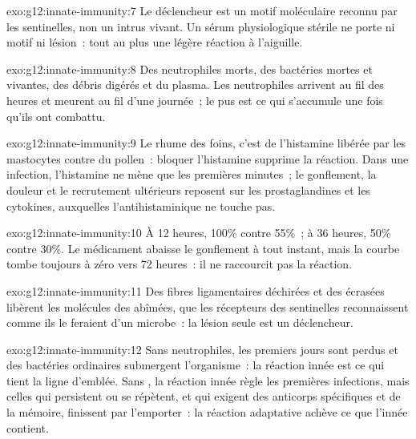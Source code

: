 \begin{solution}{exo:g12:innate-immunity:7}
Le déclencheur est un motif moléculaire reconnu par les 
sentinelles, non un intrus vivant. Un sérum physiologique stérile ne
porte ni motif ni lésion~: tout au plus une légère réaction à
l'aiguille.
\end{solution}

\begin{solution}{exo:g12:innate-immunity:8}
Des neutrophiles morts, des bactéries mortes et vivantes, des débris
digérés et du plasma. Les neutrophiles arrivent au fil des heures et
meurent au fil d'une journée~; le pus est ce qui s'accumule une fois
qu'ils ont combattu.
\end{solution}

\begin{solution}{exo:g12:innate-immunity:9}
Le rhume des foins, c'est de l'histamine libérée par les mastocytes
contre du pollen~: bloquer l'histamine supprime la réaction. Dans une
infection, l'histamine ne mène que les premières minutes~; le
gonflement, la douleur et le recrutement ultérieurs reposent sur les
prostaglandines et les cytokines, auxquelles l'antihistaminique ne
touche pas.
\end{solution}

\begin{solution}{exo:g12:innate-immunity:10}
À 12 heures, 100\% contre 55\%~; à 36 heures, 50\% contre 30\%. Le
médicament abaisse le gonflement à tout instant, mais la courbe tombe
toujours à zéro vers 72 heures~: il ne raccourcit pas la réaction.
\end{solution}

\begin{solution}{exo:g12:innate-immunity:11}
Des fibres ligamentaires déchirées et des  écrasées libèrent
les molécules des  abîmées, que les récepteurs des 
sentinelles reconnaissent comme ils le feraient d'un microbe~: la
lésion seule est un déclencheur.
\end{solution}

\begin{solution}{exo:g12:innate-immunity:12}
Sans neutrophiles, les premiers jours sont perdus et des bactéries
ordinaires submergent l'organisme~: la réaction innée est ce qui tient
la ligne d'emblée. Sans , la réaction innée règle
les premières infections, mais celles qui persistent ou se répètent,
et qui exigent des anticorps spécifiques et de la mémoire, finissent
par l'emporter~: la réaction adaptative achève ce que l'innée
contient.
\end{solution}

